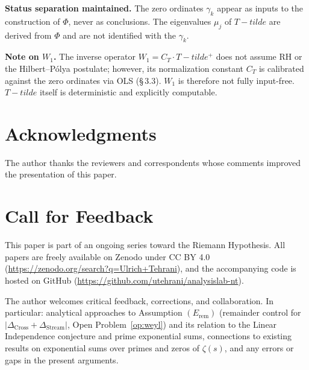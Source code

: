 \documentclass[11pt]{article}
\def\Tt{T-tilde}%
\newcommand{\Tt}{\widetilde{T}}
\newcommand{\CT}{C_{T}}
\newcommand{\Wone}{W_1}
\newcommand{\Dcross}{\Delta_{\mathrm{Cross}}}
\newcommand{\Dstream}{\Delta_{\mathrm{Stream}}}
\begin{document}
\textbf{Status separation maintained.}
The zero ordinates $\gamma_k$ appear as inputs to the construction
of $\Phi$, never as conclusions. The eigenvalues $\mu_j$ of $\Tt$
are derived from $\Phi$ and are not identified with the $\gamma_k$.

\textbf{Note on $\Wone$.}
The inverse operator $\Wone = \CT\cdot\Tt^+$ does not assume RH or
the Hilbert--P\'olya postulate; however, its normalization constant
$\CT$ is calibrated against the zero ordinates via OLS (\S\,3.3).
$\Wone$ is therefore not fully input-free. $\Tt$ itself is
deterministic and explicitly computable.

\section*{Acknowledgments}

The author thanks the reviewers and correspondents whose
comments improved the presentation of this paper.

\section*{Call for Feedback}

This paper is part of an ongoing series toward the Riemann Hypothesis.
All papers are freely available on Zenodo under CC BY 4.0
(\url{https://zenodo.org/search?q=Ulrich+Tehrani}),
and the accompanying code is hosted on GitHub
(\url{https://github.com/utehrani/analysislab-nt}).

The author welcomes critical feedback, corrections, and collaboration.
In particular: analytical approaches to Assumption $(E_{\mathrm{rem}})$
(remainder control for $|\Dcross+\Dstream|$,
Open Problem~\ref{op:weyl}) and its relation to the
Linear Independence conjecture and prime exponential sums,
connections to existing results on exponential sums
over primes and zeros of $\zeta(s)$,
and any errors or gaps in the present arguments.
\end{document}
